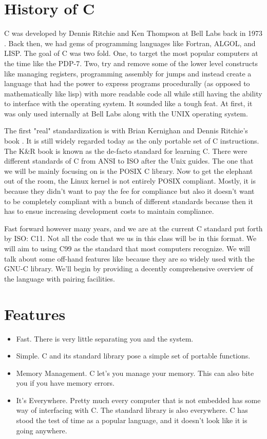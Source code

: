 \section{History of C}

C was developed by Dennis Ritchie and Ken Thompson at Bell Labs back in 1973 \cite{Ritchie:1993:DCL:155360.155580}.
Back then, we had gems of programming languages like Fortran, ALGOL, and LISP.
The goal of C was two fold.
One, to target the most popular computers at the time like the PDP-7.
Two, try and remove some of the lower level constructs like managing registers, programming assembly for jumps and instead create a language that had the power to express programs procedurally (as opposed to mathematically like lisp) with more readable code all while still having the ability to interface with the operating system.
It sounded like a tough feat.
At first, it was only used internally at Bell Labs along with the UNIX operating system.

The first "real" standardization is with Brian Kernighan and Dennis Ritchie's book \cite{kernighan1988c}. It is still widely regarded today as the only \gls{portable} set of C instructions. The K\&R book is known as the de-facto standard for learning C.  There were different standards of C from ANSI to ISO after the Unix guides. The one that we will be mainly focusing on is the \gls{POSIX} C library. Now to get the elephant out of the room, the Linux kernel is not entirely POSIX compliant. Mostly, it is because they didn't want to pay the fee for compliance but also it doesn't want to be completely compliant with a bunch of different standards because then it has to ensue increasing development costs to maintain compliance.

Fast forward however many years, and we are at the current C standard put forth by ISO: C11.
Not all the code that we us in this class will be in this format.
We will aim to using C99 as the standard that most computers recognize.
We will talk about some off-hand features like  because they are so widely used with the GNU-C library.
We'll begin by providing a decently comprehensive overview of the language with pairing facilities.

\section{Features}

\begin{itemize}
	\item Fast. There is very little separating you and the system.
	\item Simple.
    C and its standard library pose a simple set of portable functions.
	\item Memory Management.
    C let's you manage your memory.
    This can also bite you if you have memory errors.
	\item It's Everywhere.
    Pretty much every computer that is not embedded has some way of interfacing with C.
    The standard library is also everywhere.
    C has stood the test of time as a popular language, and it doesn't look like it is going anywhere.
\end{itemize}


